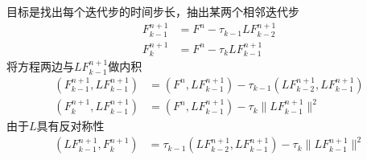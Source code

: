 \documentclass{ctexart}
\begin{document}
\begin{appendix}
目标是找出每个迭代步的时间步长，抽出某两个相邻迭代步
\begin{align*}
  F_{k-1}^{n+1} & = F^n - \tau_{k-1} L F_{k-2}^{n+1} \\
  F_k^{n+1} & = F^n - \tau_k L F_{k-1}^{n+1}
\end{align*}
将方程两边与$L F_{k-1}^{n+1}$做内积
\begin{align*}
  \left( F_{k-1}^{n+1}, L F_{k-1}^{n+1} \right) & = \left( F^n, L F_{k-1}^{n+1} \right) - \tau_{k-1} \left( L F_{k-2}^{n+1}, L F_{k-1}^{n+1} \right) \\
  \left( F_k^{n+1}, L F_{k-1}^{n+1} \right) & = \left( F^n, L F_{k-1}^{n+1} \right) - \tau_k \lVert L F_{k-1}^{n+1} \rVert^2
\end{align*}
由于$L$具有反对称性
\begin{align*}
  \left( L F_{k-1}^{n+1}, F_k^{n+1} \right) & = \tau_{k-1} \left( L F_{k-2}^{n+1}, L F_{k-1}^{n+1} \right) - \tau_k \lVert L F_{k-1}^{n+1} \rVert^2
\end{align*}

\end{appendix}
\end{document}

